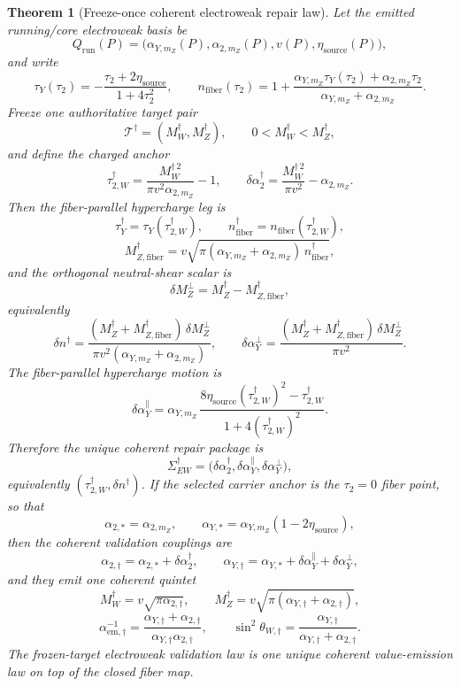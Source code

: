 \documentclass[11pt]{article}
\newtheorem{theorem}{Theorem}[section]
\begin{document}
\begin{theorem}[Freeze-once coherent electroweak repair law]
Let the emitted running/core electroweak basis be
\[
Q_{\mathrm{run}}(P)=
\bigl(\alpha_{Y,m_Z}(P),\alpha_{2,m_Z}(P),v(P),\eta_{\mathrm{source}}(P)\bigr),
\]
and write
\[
\tau_Y(\tau_2)
=
-\frac{\tau_2+2\eta_{\mathrm{source}}}{1+4\tau_2^2},
\qquad
n_{\mathrm{fiber}}(\tau_2)
=
1+\frac{\alpha_{Y,m_Z}\tau_Y(\tau_2)+\alpha_{2,m_Z}\tau_2}
{\alpha_{Y,m_Z}+\alpha_{2,m_Z}}.
\]
Freeze one authoritative target pair
\[
\mathcal T^\dagger=(M_W^\dagger,M_Z^\dagger),
\qquad 0<M_W^\dagger<M_Z^\dagger,
\]
and define the charged anchor
\[
\tau_{2,W}^\dagger
=
\frac{M_W^{\dagger\,2}}{\pi v^2\alpha_{2,m_Z}}-1,
\qquad
\delta\alpha_2^\dagger
=
\frac{M_W^{\dagger\,2}}{\pi v^2}-\alpha_{2,m_Z}.
\]
Then the fiber-parallel hypercharge leg is
\[
\tau_Y^\dagger=\tau_Y(\tau_{2,W}^\dagger),
\qquad
n_{\mathrm{fiber}}^\dagger=n_{\mathrm{fiber}}(\tau_{2,W}^\dagger),
\]
\[
M_{Z,\mathrm{fiber}}^\dagger
=
v\sqrt{\pi(\alpha_{Y,m_Z}+\alpha_{2,m_Z})\,n_{\mathrm{fiber}}^\dagger},
\]
and the orthogonal neutral-shear scalar is
\[
\delta M_Z^\perp=M_Z^\dagger-M_{Z,\mathrm{fiber}}^\dagger,
\]
equivalently
\[
\delta n^\dagger
=
\frac{(M_Z^\dagger+M_{Z,\mathrm{fiber}}^\dagger)\,\delta M_Z^\perp}
{\pi v^2(\alpha_{Y,m_Z}+\alpha_{2,m_Z})},
\qquad
\delta\alpha_Y^\perp
=
\frac{(M_Z^\dagger+M_{Z,\mathrm{fiber}}^\dagger)\,\delta M_Z^\perp}{\pi v^2}.
\]
The fiber-parallel hypercharge motion is
\[
\delta\alpha_Y^\parallel
=
\alpha_{Y,m_Z}\,
\frac{8\eta_{\mathrm{source}}(\tau_{2,W}^\dagger)^2-\tau_{2,W}^\dagger}
{1+4(\tau_{2,W}^\dagger)^2}.
\]
Therefore the unique coherent repair package is
\[
\Sigma_{EW}^\dagger
=
\bigl(\delta\alpha_2^\dagger,\delta\alpha_Y^\parallel,\delta\alpha_Y^\perp\bigr),
\]
equivalently \((\tau_{2,W}^\dagger,\delta n^\dagger)\). If the selected carrier anchor is the
\(\tau_2=0\) fiber point, so that
\[
\alpha_{2,*}=\alpha_{2,m_Z},
\qquad
\alpha_{Y,*}=\alpha_{Y,m_Z}(1-2\eta_{\mathrm{source}}),
\]
then the coherent validation couplings are
\[
\alpha_{2,\dagger}=\alpha_{2,*}+\delta\alpha_2^\dagger,
\qquad
\alpha_{Y,\dagger}=\alpha_{Y,*}+\delta\alpha_Y^\parallel+\delta\alpha_Y^\perp,
\]
and they emit one coherent quintet
\[
M_W^\dagger=v\sqrt{\pi\alpha_{2,\dagger}},
\qquad
M_Z^\dagger=v\sqrt{\pi(\alpha_{Y,\dagger}+\alpha_{2,\dagger})},
\]
\[
\alpha_{\mathrm{em},\dagger}^{-1}
=
\frac{\alpha_{Y,\dagger}+\alpha_{2,\dagger}}
{\alpha_{Y,\dagger}\alpha_{2,\dagger}},
\qquad
\sin^2\theta_{W,\dagger}
=
\frac{\alpha_{Y,\dagger}}{\alpha_{Y,\dagger}+\alpha_{2,\dagger}}.
\]
The frozen-target electroweak validation law is one unique coherent value-emission law on top of
the closed fiber map.
\end{theorem}
\end{document}
